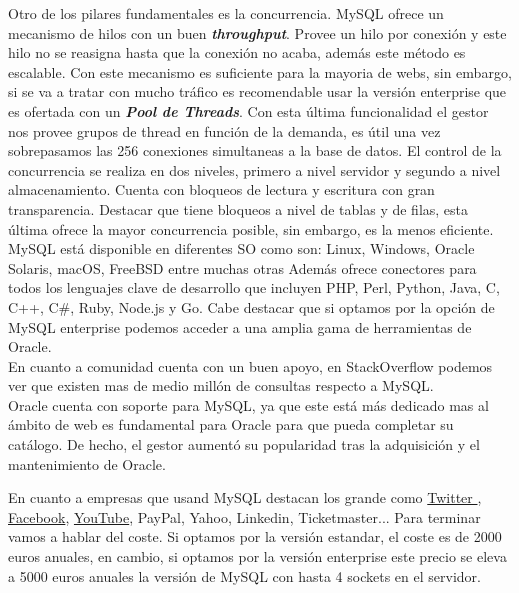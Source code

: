 \documentclass{article}
\begin{document}
Otro de los pilares fundamentales es la concurrencia. MySQL ofrece un mecanismo de hilos con un buen \textbf{\textit{throughput}}. Provee un hilo por conexión y este hilo no se reasigna hasta que la conexión no acaba, además este método es escalable. Con este mecanismo es suficiente para la mayoria de webs, sin embargo, si se va a tratar con mucho tráfico es recomendable usar la versión enterprise que es ofertada con un \textbf{\textit{Pool de Threads}}. Con esta última funcionalidad el gestor nos provee grupos de thread en función de la demanda, es útil una vez sobrepasamos las 256 conexiones simultaneas a la base de datos.
El control de la concurrencia se realiza en dos niveles, primero a nivel servidor y segundo a nivel almacenamiento. Cuenta con bloqueos de lectura y escritura con gran transparencia. Destacar que tiene bloqueos a nivel de tablas y de filas, esta última ofrece la mayor concurrencia posible, sin embargo, es la menos eficiente. \cite{enterprise}\\


MySQL está disponible en diferentes SO como son: Linux, Windows, Oracle Solaris,  macOS, FreeBSD entre muchas otras
Además ofrece conectores para todos los lenguajes clave de desarrollo que incluyen PHP, Perl, Python, Java, C, C++, C\#, Ruby, Node.js y Go. Cabe destacar que si optamos por la opción de MySQL enterprise podemos acceder a una amplia gama de herramientas de Oracle. \\
En cuanto a comunidad cuenta con un buen apoyo, en StackOverflow podemos ver que existen mas de medio millón de consultas respecto a MySQL.\\
Oracle cuenta con soporte para MySQL, ya que este está más dedicado mas al ámbito de web es fundamental para Oracle para que pueda completar su catálogo. De hecho, el gestor aumentó su popularidad tras la adquisición y el mantenimiento de Oracle.

En cuanto a empresas que usand MySQL destacan los grande como
 \href{https://blog.twitter.com/engineering/en_us/a/2013/new-tweets-per-second-record-and-how.html}{Twitter }, 
\href{https://www.theregister.co.uk/2013/06/27/facebook_tao/}{Facebook},
 \href{http://highscalability.com/blog/2012/3/26/7-years-of-youtube-scalability-lessons-in-30-minutes.html}{YouTube},
  PayPal, Yahoo, Linkedin, Ticketmaster...
Para terminar vamos a hablar del coste. Si optamos por la versión estandar, el coste es de 2000 euros anuales, en cambio, si optamos por la versión enterprise este precio se eleva a 5000 euros anuales la versión de MySQL con hasta 4 sockets en el servidor.\cite{precios}\\
\end{document}
